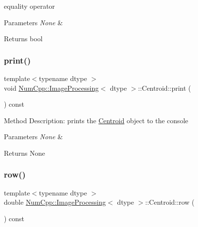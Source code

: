 equality operator


\begin{DoxyParams}{Parameters}
{\em None} & \\
\hline
\end{DoxyParams}
\begin{DoxyReturn}{Returns}
bool 
\end{DoxyReturn}
\mbox{\label{class_num_cpp_1_1_image_processing_1_1_centroid_a45c0fa5857ea4b32e50c9f0a81f8fb28}} 
\subsubsection{\texorpdfstring{print()}{print()}}
{\footnotesize\ttfamily template$<$typename dtype $>$ \\
void \mbox{\hyperlink{class_num_cpp_1_1_image_processing}{Num\+Cpp\+::\+Image\+Processing}}$<$ dtype $>$\+::Centroid\+::print (\begin{DoxyParamCaption}{ }\end{DoxyParamCaption}) const\hspace{0.3cm}{\ttfamily [inline]}}

Method Description\+: prints the \mbox{\hyperlink{class_num_cpp_1_1_image_processing_1_1_centroid}{Centroid}} object to the console


\begin{DoxyParams}{Parameters}
{\em None} & \\
\hline
\end{DoxyParams}
\begin{DoxyReturn}{Returns}
None 
\end{DoxyReturn}
\mbox{\label{class_num_cpp_1_1_image_processing_1_1_centroid_ac7cd7464ef23d8f67bf3f979124b54c9}} 
\subsubsection{\texorpdfstring{row()}{row()}}
{\footnotesize\ttfamily template$<$typename dtype $>$ \\
double \mbox{\hyperlink{class_num_cpp_1_1_image_processing}{Num\+Cpp\+::\+Image\+Processing}}$<$ dtype $>$\+::Centroid\+::row (\begin{DoxyParamCaption}{ }\end{DoxyParamCaption}) const\hspace{0.3cm}{\ttfamily [inline]}}

